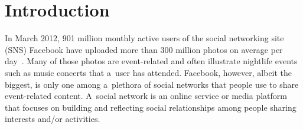 \documentclass[runningheads,a4paper]{llncs}
\begin{document}



\section{Introduction}                                                      \label{sec:introduction}
In March 2012, 901 million monthly active users of the social networking site (SNS) Facebook have uploaded more than 300 million photos on average per day~\cite{Facebook2012}. Many of those photos are event-related and often illustrate nightlife events such as music concerts that a~user has attended. Facebook, however, albeit the biggest, is only one among a~plethora of social networks that people use to share event-related content.
A~social network is an online service or media platform that focuses on building and reflecting social relationships among people sharing interests and/or activities.
\end{document}
